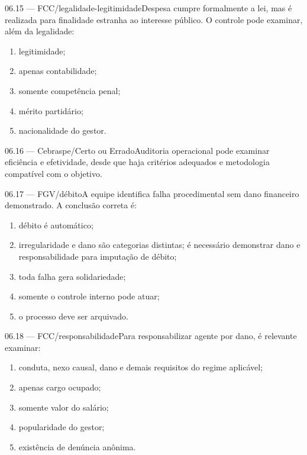 \begin{questao}{ 06.15 — FCC/legalidade-legitimidade}Despesa cumpre formalmente a lei, mas é realizada para finalidade estranha ao interesse público. O controle pode examinar, além da legalidade:\begin{enumerate}[label=\Alph*)]\item legitimidade;\item apenas contabilidade;\item somente competência penal;\item mérito partidário;\item nacionalidade do gestor.\end{enumerate}\end{questao}
\begin{questao}{ 06.16 — Cebraspe/Certo ou Errado}Auditoria operacional pode examinar eficiência e efetividade, desde que haja critérios adequados e metodologia compatível com o objetivo.\end{questao}
\begin{questao}{ 06.17 — FGV/débito}A equipe identifica falha procedimental sem dano financeiro demonstrado. A conclusão correta é:\begin{enumerate}[label=\Alph*)]\item débito é automático;\item irregularidade e dano são categorias distintas; é necessário demonstrar dano e responsabilidade para imputação de débito;\item toda falha gera solidariedade;\item somente o controle interno pode atuar;\item o processo deve ser arquivado.\end{enumerate}\end{questao}
\begin{questao}{ 06.18 — FCC/responsabilidade}Para responsabilizar agente por dano, é relevante examinar:\begin{enumerate}[label=\Alph*)]\item conduta, nexo causal, dano e demais requisitos do regime aplicável;\item apenas cargo ocupado;\item somente valor do salário;\item popularidade do gestor;\item existência de denúncia anônima.\end{enumerate}\end{questao}
